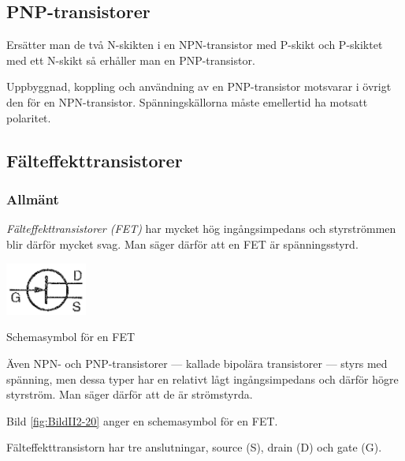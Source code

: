\subsection{PNP-transistorer}

Ersätter man de två N-skikten i en NPN-transistor med P-skikt och P-skiktet med
ett N-skikt så erhåller man en PNP-transistor.

Uppbyggnad, koppling och användning av en PNP-transistor motsvarar i övrigt den
för en NPN-transistor. Spänningskällorna måste emellertid ha motsatt polaritet.

\subsection{Fälteffekttransistorer}

\subsubsection{Allmänt}

\emph{Fälteffekttransistorer (FET)} har mycket hög ingångsimpedans och
styrströmmen blir därför mycket svag.
Man säger därför att en FET är spänningsstyrd.

\begin{marginfigure}
	\includegraphics[width=0.2\textwidth]{images/cropped_pdfs/bild_2_2-20.pdf}
	\caption{Schemasymbol för en FET}
	\label{fig:BildII2-20}
\end{marginfigure}

Även NPN- och PNP-transistorer --- kallade bipolära transistorer --- styrs med
spänning, men dessa typer har en relativt lågt ingångsimpedans och därför högre
styrström. Man säger därför att de är strömstyrda.

Bild \ref{fig:BildII2-20} anger en schemasymbol för en FET.

Fälteffekttransistorn har tre anslutningar, source (S), drain (D) och gate (G).

